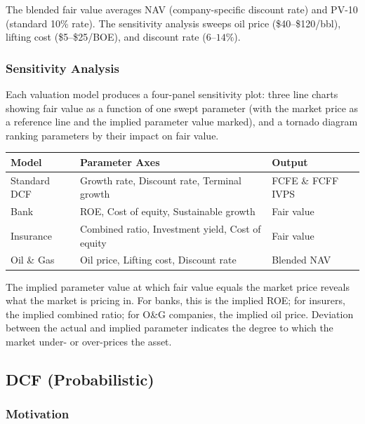 The blended fair value averages NAV (company-specific discount rate) and PV-10 (standard 10\% rate). The sensitivity analysis sweeps oil price (\$40--\$120/bbl), lifting cost (\$5--\$25/BOE), and discount rate ($6\text{--}14\%$).

\subsubsection{Sensitivity Analysis}

Each valuation model produces a four-panel sensitivity plot: three line charts showing fair value as a function of one swept parameter (with the market price as a reference line and the implied parameter value marked), and a tornado diagram ranking parameters by their impact on fair value.

\renewcommand{\arraystretch}{1.4}

\noindent
\begin{tabular}{lll}
\textbf{Model} & \textbf{Parameter Axes} & \textbf{Output} \\
\hline
Standard DCF & Growth rate, Discount rate, Terminal growth & FCFE \& FCFF IVPS \\
Bank & ROE, Cost of equity, Sustainable growth & Fair value \\
Insurance & Combined ratio, Investment yield, Cost of equity & Fair value \\
Oil \& Gas & Oil price, Lifting cost, Discount rate & Blended NAV \\
\end{tabular}

\vspace{0.5em}

The implied parameter value at which fair value equals the market price reveals what the market is pricing in. For banks, this is the implied ROE; for insurers, the implied combined ratio; for O\&G companies, the implied oil price. Deviation between the actual and implied parameter indicates the degree to which the market under- or over-prices the asset.

\newpage\subsection{DCF (Probabilistic)}

\subsubsection{Motivation}

